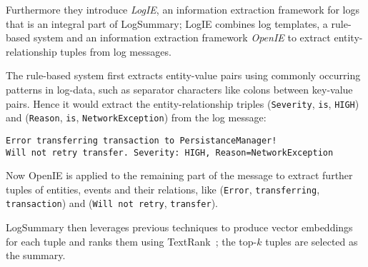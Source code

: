 Furthermore they introduce \emph{LogIE},
an information extraction framework for logs that is an integral part of LogSummary;
LogIE combines log templates, a rule-based system and an information extraction framework \emph{OpenIE}
to extract entity-relationship tuples from log messages.~\parencite[4]{log_summary}

The rule-based system first extracts entity-value pairs using commonly occurring patterns in log-data,
such as separator characters like colons between key-value pairs.
Hence it would extract the entity-relationship triples (\verb+Severity+, \verb+is+, \verb+HIGH+)
and (\verb+Reason+, \verb+is+, \verb+NetworkException+) from the log message:
\begin{verbatim}
Error transferring transaction to PersistanceManager!
Will not retry transfer. Severity: HIGH, Reason=NetworkException
\end{verbatim}
Now OpenIE is applied to the remaining part of the message to extract further
tuples of entities, events and their relations, like (\verb+Error+, \verb+transferring+, \verb+transaction+) and (\verb+Will not retry+, \verb+transfer+).

LogSummary then leverages previous techniques to produce vector embeddings for each tuple and ranks them using TextRank~\parencite{textrank};
the top-\(k\) tuples are selected as the summary.

